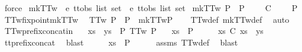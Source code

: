 \begin{isabellebody}
\ force%
\endisatagproof
{\isafoldproof}%
%
\isadelimproof
\isanewline
%
\endisadelimproof
\isanewline
{}\isamarkupfalse%
\ mkTT{}w\ {\isacharcolon}{\isacharcolon}\ {\isachardoublequoteopen}{\isacharprime}e\ ttobs\ list\ set\ {\isasymRightarrow}\ {\isacharprime}e\ ttobs\ list\ set{\isachardoublequoteclose}\ \isanewline
{\isachardoublequoteopen}mkTT{}w\ P\ {\isacharequal}\ P\ {\isasymunion}\ {\isacharbraceleft}{\isasymrho}{\isacharbar}{\isasymrho}\ {\isasymsigma}{\isachardot}\ {\isasymrho}\ {\isasymle}\isactrlsub C\ {\isasymsigma}\ {\isasymand}\ {\isasymsigma}\ {\isasymin}\ P{\isacharbraceright}{\isachardoublequoteclose}\isanewline
\isanewline
{}\isamarkupfalse%
\ TT{}w{\isacharunderscore}fixpoint{\isacharunderscore}mkTT{}w{\isacharcolon}\isanewline
\ \ {\isachardoublequoteopen}TT{}w\ P\ {\isacharequal}\ {\isacharparenleft}P\ {\isacharequal}\ mkTT{}w{\isacharparenleft}P{\isacharparenright}{\isacharparenright}{\isachardoublequoteclose}\isanewline
%
\isadelimproof
\ \ %
\endisadelimproof
%
\isatagproof
{}\isamarkupfalse%
\ TT{}w{\isacharunderscore}def\ mkTT{}w{\isacharunderscore}def\ \isamarkupfalse%
\ auto%
\endisatagproof
{\isafoldproof}%
%
\isadelimproof
\isanewline
%
\endisadelimproof
\isanewline
{}\isamarkupfalse%
\ TT{}w{\isacharunderscore}prefix{\isacharunderscore}concat{\isacharunderscore}in{\isacharcolon}\isanewline
\ \ \ {\isachardoublequoteopen}xs\ {\isacharat}\ ys\ {\isasymin}\ P{\isachardoublequoteclose}\ {\isachardoublequoteopen}TT{}w\ P{\isachardoublequoteclose}\isanewline
\ \ \ {\isachardoublequoteopen}xs\ {\isasymin}\ P{\isachardoublequoteclose}\isanewline
%
\isadelimproof
%
\endisadelimproof
%
\isatagproof
{}\isamarkupfalse%
\ {\isacharminus}\isanewline
\ \ \isamarkupfalse%
\ {\isachardoublequoteopen}xs\ {\isasymle}\isactrlsub C\ xs\ {\isacharat}\ ys{\isachardoublequoteclose}\isanewline
\ \ \ \ \isamarkupfalse%
\ tt{\isacharunderscore}prefix{\isacharunderscore}concat\ \isamarkupfalse%
\ blast\isanewline
\ \ \isamarkupfalse%
\ \isamarkupfalse%
\ {\isachardoublequoteopen}xs\ {\isasymin}\ P{\isachardoublequoteclose}\isanewline
\ \ \ \ \isamarkupfalse%
\ assms\ TT{}w{\isacharunderscore}def\ \isamarkupfalse%
\ blast\isanewline
\ \ \isamarkupfalse%

\end{isabellebody}
